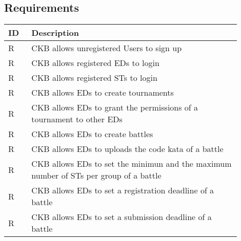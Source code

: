 \subsection{Requirements}
\label{subsec:requirements3}%
\setcounter{req}{1}
\newcommand{\creq}{\thereq\stepcounter{req}}
\begin{center}
    \begin{longtable}{|l|p{0.9\linewidth}|}
        \hline
        \textbf{ID} & \textbf{Description}                                                                                                                             \\
        \hline
        R\creq      & CKB allows unregistered Users to sign up                                                                    \\
        \hline
        R\creq      & CKB allows registered EDs to login                                                                    \\
        \hline
        R\creq      & CKB allows registered STs to login                                                                    \\
        \hline
        R\creq      & CKB allows EDs to create tournaments                                                                    \\
        \hline
        R\creq      & CKB allows EDs to grant the permissions of a tournament to other EDs                                                                 \\
        \hline
        R\creq      & CKB allows EDs to create battles                                                                    \\
        \hline
        R\creq      & CKB allows EDs to uploads the code kata of a battle                                                                   \\
        \hline
        R\creq      & CKB allows EDs to set the minimun and the maximum number of STs per group of a battle                                                                    \\
        \hline
        R\creq      & CKB allows EDs to set a registration deadline of a battle                                                                 \\
        \hline
        R\creq      & CKB allows EDs to set a submission deadline of a battle                                                                \\

\end{longtable}
\end{center}
